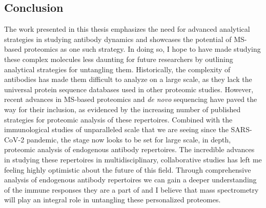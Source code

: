 \subsection{Conclusion}
The work presented in this thesis emphasizes the need for advanced analytical strategies in studying antibody dynamics and showcases the potential of MS-based proteomics as one such strategy. In doing so, I hope to have made studying these complex molecules less daunting for future researchers by outlining analytical strategies for untangling them.
Historically, the complexity of antibodies has made them difficult to analyze on a large scale, as they lack the universal protein sequence databases used in other proteomic studies. However, recent advances in MS-based proteomics and \emph{de novo} sequencing have paved the way for their inclusion, as evidenced by the increasing number of published strategies for proteomic analysis of these repertoires. Combined with the immunological studies of unparalleled scale that we are seeing since the SARS-CoV-2 pandemic, the stage now looks to be set for large scale, in depth, proteomic analysis of endogenous antibody repertoires.
The incredible advances in studying these repertoires in multidisciplinary, collaborative studies has left me feeling highly optimistic about the future of this field. Through comprehensive analysis of endogenous antibody repertoires we can gain a deeper understanding of the immune responses they are a part of and I believe that mass spectrometry will play an integral role in untangling these personalized proteomes.

